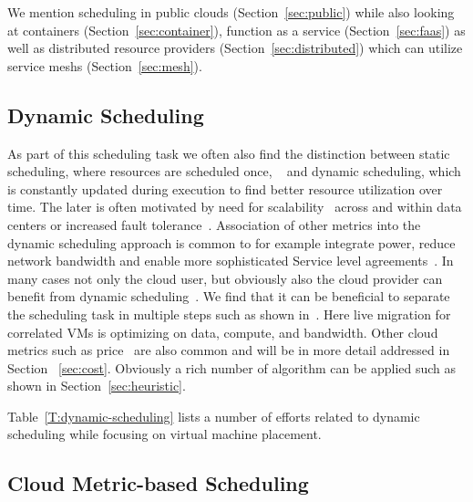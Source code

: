 \documentclass[final,5p,times,twocolumn]{elsarticle}
\begin{document}
We mention scheduling in public clouds (Section~\ref{sec:public})
while also looking at containers (Section~\ref{sec:container}),
function as a service (Section~\ref{sec:faas}) as well as distributed
resource providers (Section~\ref{sec:distributed}) which can utilize
service meshs (Section~\ref{sec:mesh}).





\subsection{Dynamic Scheduling}\label{sec:dynamic}



As part of this scheduling task we often also find the distinction
between static scheduling, where resources are scheduled once,
~\cite{jennings2015resource} and dynamic scheduling, which is
constantly updated during execution to find better resource
utilization over time. The later is often motivated by need for
scalability~\cite{keller2014hierarchical} across and within data
centers or increased fault
tolerance~\cite{tighe2013distributed}. Association of other metrics
into the dynamic scheduling approach is common to for example
integrate power, reduce network bandwidth and enable more
sophisticated Service level agreements~\cite{tighe2013distributed}. In
many cases not only the cloud user, but obviously also the cloud
provider can benefit from dynamic
scheduling~\cite{tighe2014integrating}. We find that it can be
beneficial to separate the scheduling task in multiple steps such as
shown in~\cite{sun2015live}. Here live migration for correlated VMs is
optimizing on data, compute, and bandwidth. Other cloud metrics such
as price~\cite{tordsson2012cloud} are also common and will be in more
detail addressed in Section ~\ref{sec:cost}. Obviously a rich number
of algorithm can be applied such as shown in
Section~\ref{sec:heuristic}.

Table~\ref{T:dynamic-scheduling} lists a number of efforts related to
dynamic scheduling while focusing on virtual machine placement.






\subsection{Cloud Metric-based Scheduling}\label{sec:vm-scheduling}
\end{document}
